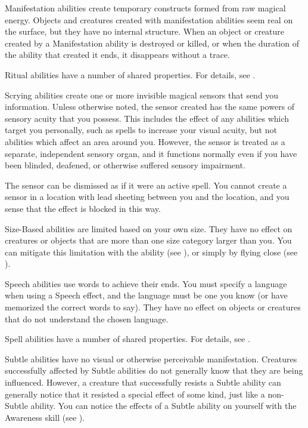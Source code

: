      Manifestation abilities create temporary constructs formed from raw magical energy.
    Objects and creatures created with manifestation abilities seem real on the surface, but they have no internal structure.
    When an object or creature created by a Manifestation ability is destroyed or killed, or when the duration of the ability that created it ends, it disappears without a trace.

     Ritual abilities have a number of shared properties.
    For details, see .

     Scrying abilities create one or more invisible magical sensors that send you information.
    Unless otherwise noted, the sensor created has the same powers of sensory acuity that you possess.
    This includes the effect of any abilities which target you personally, such as spells to increase your visual acuity, but not abilities which affect an area around you.
    However, the sensor is treated as a separate, independent sensory organ, and it functions normally even if you have been blinded, deafened, or otherwise suffered sensory impairment.
    \par The sensor can be dismissed as if it were an active spell.
    You cannot create a sensor in a location with lead sheeting between you and the location, and you sense that the effect is blocked in this way.

     Size-Based abilities are limited based on your own size.
    They have no effect on creatures or objects that are more than one size category larger than you.
    You can mitigate this limitation with the  ability (see ), or simply by flying close (see ).

     Speech abilities use words to achieve their ends.
    You must specify a language when using a Speech effect, and the language must be one you know (or have memorized the correct words to say). They have no effect on objects or creatures that do not understand the chosen language.

     Spell abilities have a number of shared properties.
    For details, see .

     Subtle abilities have no visual or otherwise perceivable manifestation.
    Creatures successfully affected by Subtle abilities do not generally know that they are being influenced.
    However, a creature that successfully resists a Subtle ability can generally notice that it resisted a special effect of some kind, just like a non-Subtle ability.
    You can notice the effects of a Subtle ability on yourself with the Awareness skill (see ).


